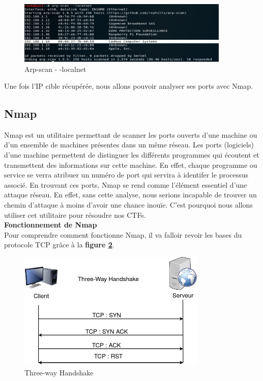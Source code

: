 \begin{figure}[htp!]
  \centering
  \setlength\figureheight{7cm}
  \setlength\figurewidth{9cm}
  \includegraphics[width=0.9\textwidth]{oui/images/Arpscan/unknown.png}
  \caption{Arp-scan  - -localnet}
  \label{fig:arpscanl}
\end{figure}

Une fois l'IP cible récupérée, nous allons pouvoir analyser ses ports avec Nmap.

\subsection{Nmap}

Nmap est un utilitaire permettant de scanner les ports ouverts d’une machine ou d’un ensemble de machines présentes dans un même réseau. Les ports (logiciels) d'une machine permettent de distinguer les différents programmes qui écoutent et transmettent des informations sur cette machine. En effet, chaque programme ou service se verra atribuer un numéro de port qui servira à identifer le processus associé. En trouvant ces ports, Nmap se rend comme l’élément essentiel d’une attaque réseau. En effet, sans cette analyse, nous serions incapable de trouver un chemin d’attaque à moins d’avoir une chance inouïe. C’est pourquoi nous allons utiliser cet utilitaire pour résoudre nos CTFs.\\

 \textbf{Fonctionnement de Nmap}\\

Pour comprendre comment fonctionne Nmap, il va falloir revoir les bases du protocole TCP grâce à la \textbf{figure \ref{fig:3way}}.


\newpage

\begin{figure}[htp!]
  \centering
  \setlength\figureheight{7cm}
  \setlength\figurewidth{9cm}
  \includegraphics[width=0.8\textwidth]{oui/images/nmap/3way.png}
  \caption{Three-way Handshake}
  \label{fig:3way}
\end{figure}


